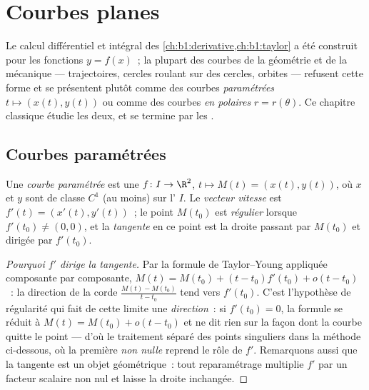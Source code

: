 \chapter{Courbes planes}\label{ch:b1:curves}

Le calcul différentiel et intégral des \cref{ch:b1:derivative,ch:b1:taylor}
a été construit pour les fonctions $y = f(x)$~; la plupart des
courbes de la géométrie et de la mécanique --- trajectoires,
cercles roulant sur des cercles, orbites --- refusent cette forme
et se présentent plutôt comme des courbes \emph{paramétrées} $t
\mapsto (x(t), y(t))$ ou comme des courbes \emph{en polaires} $r =
r(\theta)$. Ce chapitre classique étudie les deux, et se termine
par les .

\section{Courbes paramétrées}

\begin{definition}\label{def:b1:curves:def}
Une \emph{courbe paramétrée} est une
 $f \colon I \to \R^2$, $t \mapsto M(t) = (x(t), y(t))$,
où $x$ et $y$ sont de classe $C^1$ (au moins) sur l' $I$.
Le \emph{vecteur vitesse} est $f'(t) = (x'(t), y'(t))$~; le point
$M(t_0)$ est \emph{régulier} lorsque $f'(t_0) \neq (0,0)$, et la
\emph{tangente} en ce point est la droite passant par $M(t_0)$ et
dirigée par $f'(t_0)$.
\end{definition}

\begin{proof}[Pourquoi $f'$ dirige la tangente]
Par la formule de Taylor--Young appliquée composante par composante,
$M(t) = M(t_0) + (t - t_0) f'(t_0) + o(t - t_0)$~: la direction de
la corde $\frac{M(t) - M(t_0)}{t - t_0}$ tend vers $f'(t_0)$.
C'est l'hypothèse de régularité qui fait de cette limite une
\emph{direction}~: si $f'(t_0) = 0$, la formule se réduit
à $M(t) = M(t_0) + o(t - t_0)$ et ne dit rien sur la façon dont la
courbe quitte le point --- d'où le traitement séparé des points
singuliers dans la méthode ci-dessous, où la première 
\emph{non nulle} reprend le rôle de $f'$.
Remarquons aussi que la tangente est un objet géométrique~: tout
reparamétrage multiplie $f'$ par un facteur scalaire non nul et
laisse la droite inchangée.
\end{proof}

